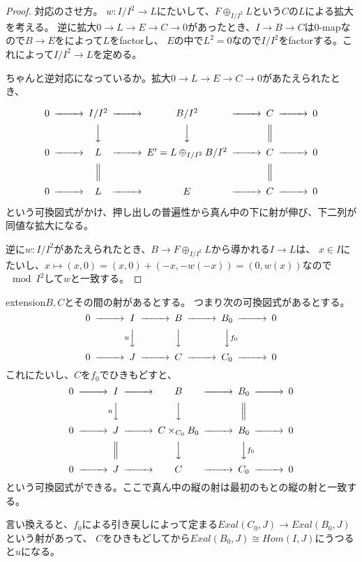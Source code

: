 \documentclass{jsarticle}
\begin{document}
\begin{proof}

対応のさせ方。
$w:I/I^2 \to L$にたいして、$F\oplus_{I/I^2} L$という$C$の$L$による拡大を考える。
逆に拡大$0 \to L \to E \to C \to0$があったとき、$I \to B \to C$は$0$-mapなので$B\to E$をによって$L$をfactorし、
$E$の中で$L^2=0$なので$I/I^2$をfactorする。これによって$I/I^2 \to L$を定める。

ちゃんと逆対応になっているか。拡大$0\to L \to E \to C \to 0$があたえられたとき、

\[
\begin{CD}
0 @>>> I/I^2 @>>> B/I^2 @>>> C @>>> 0\\
@.    @VVV    @VVV     @|    \\
0 @>>> L @>>> E'=L\oplus_{I/I^2}B/I^2 @>>> C @>>> 0\\
@.    @|       @.     @|    \\
0 @>>> L @>>> E @>>> C @>>> 0\\
\end{CD}
\]

という可換図式がかけ、押し出しの普遍性から真ん中の下に射が伸び、下二列が同値な拡大になる。

逆に$w:I/I^2$があたえられたとき、$B\to F \oplus_{I/I^2}L$から導かれる$I \to L$は、
$x\in I$にたいし、$x \mapsto (x,0)=(x,0)+(-x, -w(-x))=(0,w(x))$なので$\mod I^2$して$w$と一致する。

\end{proof}

extension$B, C$とその間の射があるとする。
つまり次の可換図式があるとする。
\[
\begin{CD}
0 @>>> I @>>> B @>>> B_0 @>>> 0\\
@.    @VuVV    @VVV     @VVf_0V    \\
0 @>>> J @>>> C @>>> C_0 @>>> 0\\
\end{CD}
\]
これにたいし、$C$を$f_0$でひきもどすと、
\[
\begin{CD}
0 @>>> I @>>> B @>>> B_0 @>>> 0\\
@.    @VuVV    @VVV     @|    \\
0 @>>> J @>>> C\times_{C_0}B_0 @>>> B_0 @>>> 0\\
@.    @|       @VVV     @VVf_0V    \\
0 @>>> J @>>> C @>>> C_0 @>>> 0\\
\end{CD}
\]
という可換図式ができる。ここで真ん中の縦の射は最初のもとの縦の射と一致する。

言い換えると、$f_0$による引き戻しによって定まる$Exal(C_0, J)\to Exal(B_0, J)$という射があって、
$C$をひきもどしてから$Exal(B_0, J) \cong Hom(I, J)$にうつると$u$になる。
\end{document}

